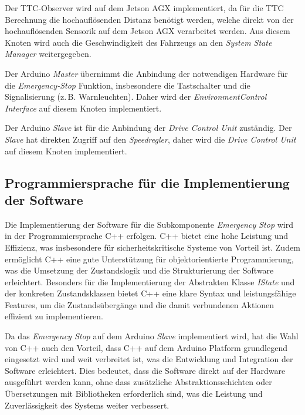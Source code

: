 Der TTC-Observer wird auf dem Jetson AGX implementiert, da für die TTC Berechnung die hochauflösenden Distanz benötigt werden, welche direkt von der
hochauflösenden Sensorik auf dem Jetson AGX verarbeitet werden. Aus diesem Knoten wird auch 
die Geschwindigkeit des Fahrzeugs an den \emph{System State Manager} weitergegeben.

Der Arduino \emph{Master} übernimmt die Anbindung der notwendigen Hardware 
für die \emph{Emergency-Stop} Funktion, insbesondere die Tastschalter und die 
Signalisierung (z.\,B. Warnleuchten). Daher wird der \emph{EnvironmentControl Interface} auf diesem Knoten implementiert. 

Der Arduino \emph{Slave} ist für die Anbindung der \emph{Drive Control Unit} zuständig. 
Der \emph{Slave} hat direkten Zugriff auf den \emph{Speedregler}, daher wird 
die \emph{Drive Control Unit} auf diesem Knoten implementiert. 


\newpage 

\subsection{Programmiersprache für die Implementierung der Software}

Die Implementierung der Software für die Subkomponente \emph{Emergency Stop} wird in der Programmiersprache C++ erfolgen. 
C++ bietet eine hohe Leistung und Effizienz, was insbesondere für sicherheitskritische Systeme von Vorteil ist.
Zudem ermöglicht C++ eine gute Unterstützung für objektorientierte Programmierung, was die Umsetzung der Zustandslogik und die Strukturierung der Software erleichtert.
Besonders für die Implementierung der Abstrakten Klasse \emph{IState} und der konkreten Zustandsklassen bietet C++ eine klare Syntax und leistungsfähige Features, 
um die Zustandsübergänge und die damit verbundenen Aktionen effizient zu implementieren.

Da das \emph{Emergency Stop} auf dem Arduino \emph{Slave} implementiert wird, hat die Wahl von C++ 
auch den Vorteil, dass C++ auf dem Arduino Platform grundlegend eingesetzt wird und weit verbreitet ist, was die 
Entwicklung und Integration der Software erleichtert.
Dies bedeutet, dass die Software direkt auf der Hardware ausgeführt werden kann, ohne dass zusätzliche
Abstraktionsschichten oder Übersetzungen mit Bibliotheken erforderlich sind, was die 
Leistung und Zuverlässigkeit des Systems weiter verbessert.


